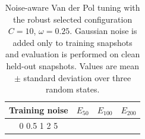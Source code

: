 \begin{table}[t]
\centering
\small
\caption{Noise-aware Van der Pol tuning with the robust selected configuration $C=10$, $\omega=0.25$. Gaussian noise is added only to training snapshots and evaluation is performed on clean held-out snapshots. Values are mean $\pm$ standard deviation over three random states.}
\label{tab:vdp_noise_tuned}
\begin{tabular}{cccc}
\toprule
Training noise & $E_{50}$ & $E_{100}$ & $E_{200}$ \\
\midrule
0%
0.5%
1%
2%
5%
\bottomrule
\end{tabular}
\end{table}
